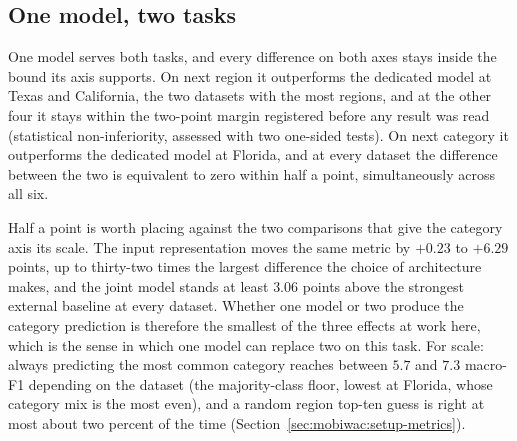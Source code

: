 \subsection{One model, two tasks}
\label{sec:mobiwac:results-part2}
One model serves both tasks, and every difference on both axes stays inside the bound its axis
supports. On next region it
outperforms the dedicated model at Texas and California, the two datasets with the most regions, and
at the other four it stays within the two-point margin registered before any result was read
(statistical non-inferiority, assessed with two one-sided tests). On next category it outperforms the
dedicated model at Florida, and at every dataset the difference between the two is equivalent to zero
within half a point, simultaneously across all six.

Half a point is worth placing against the two comparisons that give the category axis its scale. The
input representation moves the same metric by $+0.23$ to $+6.29$ points, up to thirty-two times the
largest difference the choice of architecture makes, and the joint model stands at least $3.06$ points
above the strongest external baseline at every dataset. Whether one model or two produce the category
prediction is therefore the smallest of the three effects at work here, which is the sense in which
one model can replace two on this task.
For scale: always predicting the most common category reaches between $5.7$ and $7.3$ macro-F1
depending on the dataset (the majority-class floor, lowest at Florida, whose category mix is the
most even), and a random region top-ten guess is right at most about two percent of the time
(Section~\ref{sec:mobiwac:setup-metrics}).

